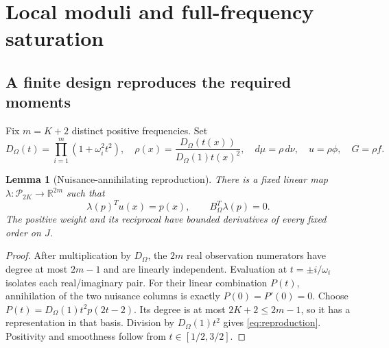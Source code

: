 \documentclass[10pt]{amsart}
\newtheorem{lemma}[theorem]{Lemma}
\theoremstyle{definition}
\theoremstyle{remark}
\newcommand{\R}{\mathbb R}
\newcommand{\Pp}{\mathcal P}
\begin{document}
\section{Local moduli and full-frequency saturation}\label{sec:diameter}
\subsection{A finite design reproduces the required moments}
Fix $m=K+2$ distinct positive frequencies. Set
\[
 D_\Omega(t)=\prod_{i=1}^m(1+\omega_i^2t^2),\quad
 \rho(x)=\frac{D_\Omega(t(x))}{D_\Omega(1)t(x)^2},\quad
 d\mu=\rho\,d\nu,\quad u=\rho\phi,\quad G=\rho f.
\]
\begin{lemma}[Nuisance-annihilating reproduction]\label{lem:reproduction}
There is a fixed linear map $\lambda:\Pp_{2K}\to\R^{2m}$ such that
\begin{equation}\label{eq:reproduction}
 \lambda(p)^Tu(x)=p(x),\qquad B_\Omega^T\lambda(p)=0.
\end{equation}
The positive weight and its reciprocal have bounded derivatives of every fixed order on $J$.
\end{lemma}
\begin{proof}
After multiplication by $D_\Omega$, the $2m$ real observation numerators have degree at most $2m-1$ and are linearly independent. Evaluation at $t=\pm i/\omega_i$ isolates each real/imaginary pair. For their linear combination $P(t)$, annihilation of the two nuisance columns is exactly $P(0)=P'(0)=0$. Choose $P(t)=D_\Omega(1)t^2p(2t-2)$. Its degree is at most $2K+2\le2m-1$, so it has a representation in that basis. Division by $D_\Omega(1)t^2$ gives \eqref{eq:reproduction}. Positivity and smoothness follow from $t\in[1/2,3/2]$.
\end{proof}
\end{document}
